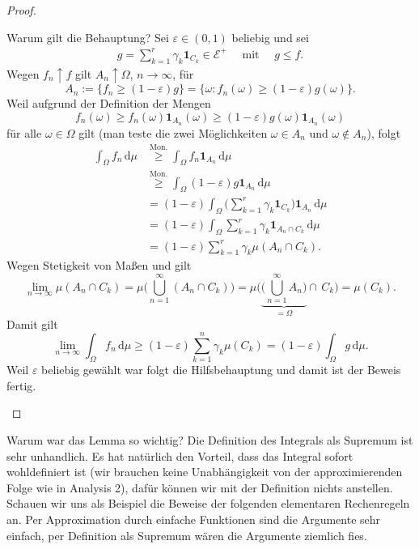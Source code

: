 \begin{proof}
\begin{itemize}
		Warum gilt die Behauptung? Sei $\varepsilon \in (0,1)$ beliebig und sei 
		\begin{align*}
		 g = \sum_{k = 1}^{r} \gamma_k \mathbf{1}_{C_k} \in \mathcal E^+ \quad \text{ mit }\quad g\leq f.
		 \end{align*}
		  Wegen $f_n \uparrow f$ gilt $A_n \uparrow \Omega$, $n \to \infty$, 	  
		   für \[A_n := \big\{ f_n \geq (1 - \varepsilon)g \big\} = \big\{ \omega \! : f_n (\omega) \geq (1 - \varepsilon) g(\omega) \big\}.\]
		Weil aufgrund der Definition der Mengen $$f_n(\omega)\geq f_n(\omega)\mathbf{1}_{A_n}(\omega)\geq  (1-\varepsilon)g(\omega)\mathbf{1}_{A_n}(\omega)$$ f\"ur alle $\omega \in \Omega$ gilt (man teste die zwei M\"oglichkeiten $\omega \in A_n$ und $\omega \notin A_n$), folgt
		\begin{align*}
			\int_{\Omega} f_n\, \mathrm{d}\mu &\overset{\text{Mon.}}{\geq} \int_{\Omega} f_n \mathbf{1}_{A_n}\, \mathrm{d}\mu\\
			&\overset{\text{Mon.}}{\geq} \int_{\Omega} (1-\varepsilon) g \mathbf{1}_{A_n}\, \mathrm{d}\mu \\
			&= (1 - \varepsilon) \int_{\Omega} \Big(\sum_{k = 1}^{r} \gamma_k \mathbf{1}_{C_k}\Big) \mathbf{1}_{A_n} \,\mathrm{d}\mu\\& = (1 - \varepsilon) \int_{\Omega} \sum_{k = 1}^{r} \gamma_k \mathbf{1}_{A_n \cap  C_k}\,\mathrm{d}\mu\\
			&=(1-\varepsilon) \sum_{k=1}^r \gamma_k \mu(A_n\cap C_k).
		\end{align*} 
		Wegen Stetigkeit von Maßen und  gilt \[\lim_{n \to \infty} \mu(A_n \cap C_k) = \mu \Big(\bigcup_{n = 1}^{\infty} (A_n \cap  C_k) \Big) = \mu \Big(\underbrace{\Big(\bigcup_{n = 1}^{\infty} A_n \Big)}_{= \Omega} \cap \,C_k \Big)=\mu(C_k).\]
		Damit gilt 
		\[ \lim_{n\to\infty} \int_{\Omega} f_n \, \mathrm{d}\mu \geq (1-\varepsilon) \sum\limits_{k = 1}^{n}  \gamma_k \mu(C_k) = (1-\varepsilon) \int_{\Omega} g\, \mathrm{d}\mu. \]
		Weil $\varepsilon$ beliebig gew\"ahlt war folgt die Hilfsbehauptung und damit ist der Beweis fertig.
	\end{itemize}	
\end{proof}
Warum war das Lemma so wichtig? Die Definition des Integrals als Supremum ist sehr unhandlich. Es hat nat\"urlich den Vorteil, dass das Integral sofort wohldefiniert ist (wir brauchen keine Unabh\"angigkeit von der approximierenden Folge wie in Analysis 2), daf\"ur k\"onnen wir mit der Definition nichts anstellen. Schauen wir uns als Beispiel die Beweise der folgenden elementaren Rechenregeln an. Per Approximation durch einfache Funktionen sind die Argumente sehr einfach, per Definition als Supremum w\"aren die Argumente ziemlich fies.

